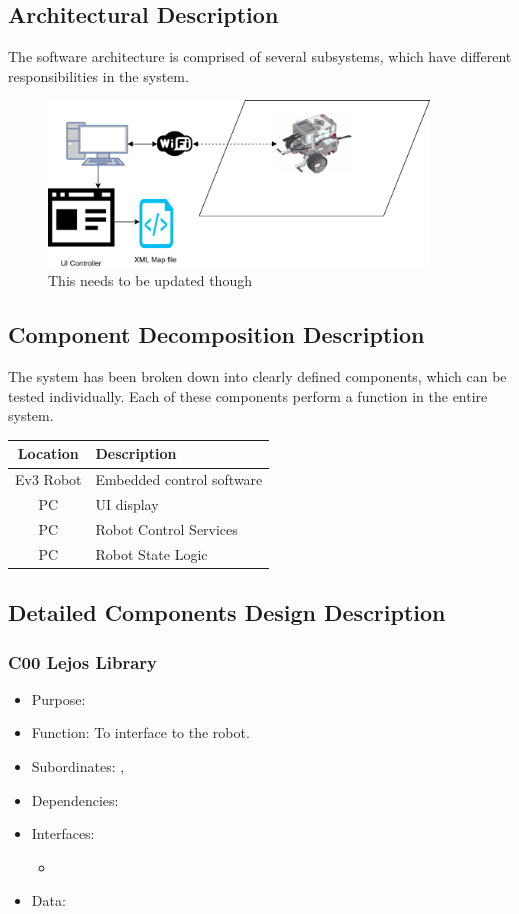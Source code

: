\subsection{Architectural Description}
The software architecture is comprised of several subsystems, which have different responsibilities in the system.

\begin{figure}
	\centering
	\includegraphics[width=0.9\textwidth]{Robot_system.png}
	\caption{\label{fig:robotSystem}This needs to be updated though}
\end{figure}   

\subsection{Component Decomposition Description}
The system has been broken down into clearly defined components, which can be tested individually. Each of these components perform a function in the entire system.

\begin{tabular}{|c|l|}
	\hline
	\bf{Location} & \bf{Description} \\
	\hline
	\hline
	Ev3 Robot & Embedded control software \\
	\hline
	PC & UI display \\
	\hline
	PC & Robot Control Services \\
	\hline
	PC & Robot State Logic \\
	\hline
\end{tabular}

\subsection{Detailed Components Design Description}

\subsubsection{C00 Lejos Library}\label{compLejos}
\begin{itemize}
	\item Purpose:
	\item Function: To interface to the robot.
	\item Subordinates: , 
	\item Dependencies:
	\item Interfaces:
	\begin{itemize}
		\item
	\end{itemize}
	\item Data:
\end{itemize}


